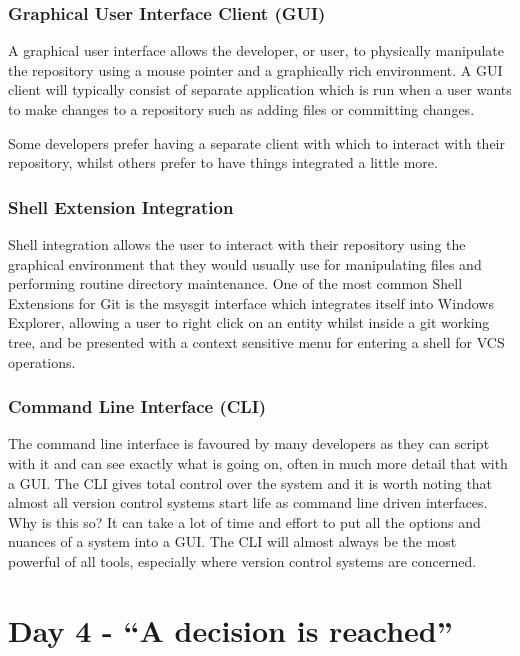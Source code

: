 \subsubsection{Graphical User Interface Client (GUI)}
A graphical user interface allows the developer, or user, to physically manipulate the repository using a mouse pointer and a graphically rich environment.
A GUI client will typically consist of separate application which is run when a user wants to make changes to a repository such as adding files or committing changes.

Some developers prefer having a separate client with which to interact with their repository, whilst others prefer to have things integrated a little more.

\subsubsection{Shell Extension Integration}
Shell integration allows the user to interact with their repository using the graphical environment that they would usually use for manipulating files and performing routine directory maintenance.
One of the most common Shell Extensions for Git is the msysgit interface which integrates itself into Windows Explorer, allowing a user to right click on an entity whilst inside a git working tree, and be presented with a context sensitive menu for entering a shell for VCS operations.

\subsubsection{Command Line Interface (CLI)}
The command line interface is favoured by many developers as they can script with it and can see exactly what is going on, often in much more detail that with a GUI.
The CLI gives total control over the system and it is worth noting that almost all version control systems start life as command line driven interfaces.
Why is this so? It can take a lot of time and effort to put all the options and nuances of a system into a GUI.
The CLI will almost always be the most powerful of all tools, especially where version control systems are concerned.

\section{Day 4 - ``A decision is reached''}
